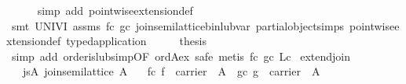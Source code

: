 \begin{isabellebody}
\ \ \ \ \isamarkupfalse%
\ {}simp\ add{}\ pointwise{}extension{}def{}\isanewline
\ \ \ \ \isamarkupfalse%
\ {}smt\ UNIV{}I\ assms\ fc\ gc\ join{}semilattice{}bin{}lub{}var\ partial{}object{}simps{}{}{}\ pointwise{}extension{}def\ typed{}application{}\isanewline
\isanewline
\ \ \isamarkupfalse%
\ \isamarkupfalse%
\ {}thesis\isanewline
\ \ \ \ \isamarkupfalse%
\ {}simp\ add{}\ order{}is{}lub{}simp{}OF\ ord{}A{}ex{}{}\ safe{}\ {}metis\ fc\ gc\ Lc{}{}{}\isanewline
{}\isamarkupfalse%
%
\endisatagproof
{\isafoldproof}%
%
\isadelimproof
\isanewline
%
\endisadelimproof
\isanewline
{}\isamarkupfalse%
\ extend{}join{}\isanewline
\ \ \ js{}A{}\ {}join{}semilattice\ A{}\isanewline
\ \ \ fc{}\ {}f\ {}\ carrier\ {}{}\ A{}{}\ \ gc{}\ {}g\ {}\ carrier\ {}{}\ A{}{}\isanewline

\end{isabellebody}
